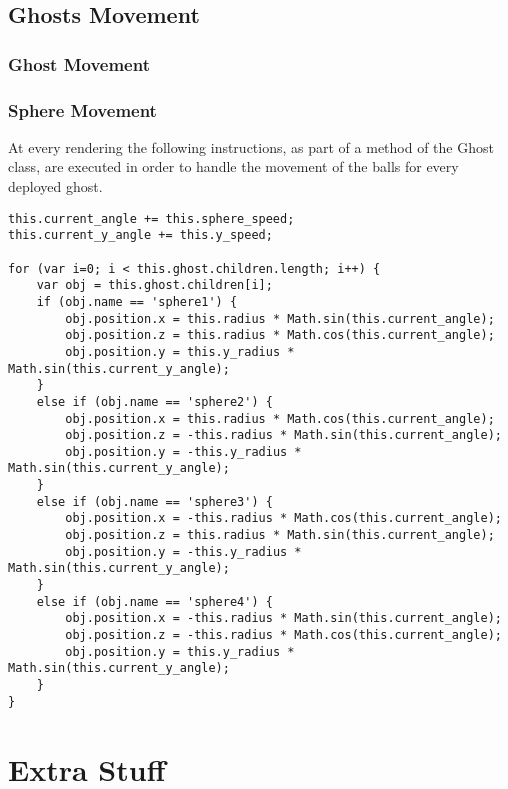 \documentclass[a4paper,oneside]{report}
\begin{document}
\section{Ghosts Movement}
\subsection{Ghost Movement}
\subsection{Sphere Movement}
At every rendering the following instructions, as part of a method of the Ghost class, are executed in order to handle the movement of the balls for every deployed ghost.
\begin{lstlisting}
this.current_angle += this.sphere_speed;
this.current_y_angle += this.y_speed;

for (var i=0; i < this.ghost.children.length; i++) {
    var obj = this.ghost.children[i];
    if (obj.name == 'sphere1') {
        obj.position.x = this.radius * Math.sin(this.current_angle);
        obj.position.z = this.radius * Math.cos(this.current_angle);
        obj.position.y = this.y_radius * Math.sin(this.current_y_angle);
    }
    else if (obj.name == 'sphere2') {
        obj.position.x = this.radius * Math.cos(this.current_angle);
        obj.position.z = -this.radius * Math.sin(this.current_angle);
        obj.position.y = -this.y_radius * Math.sin(this.current_y_angle);
    }
    else if (obj.name == 'sphere3') {
        obj.position.x = -this.radius * Math.cos(this.current_angle);
        obj.position.z = this.radius * Math.sin(this.current_angle);
        obj.position.y = -this.y_radius * Math.sin(this.current_y_angle);
    }
    else if (obj.name == 'sphere4') {
        obj.position.x = -this.radius * Math.sin(this.current_angle);
        obj.position.z = -this.radius * Math.cos(this.current_angle);
        obj.position.y = this.y_radius * Math.sin(this.current_y_angle);
    }
}
\end{lstlisting}

\chapter{Extra Stuff}
\end{document}
